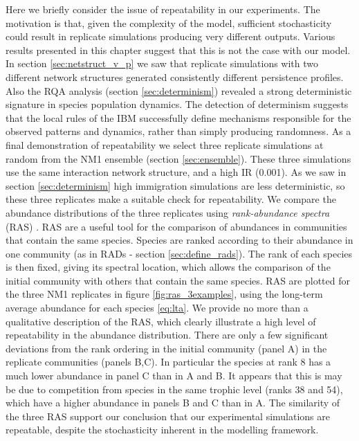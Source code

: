Here we briefly consider the issue of repeatability in our experiments. The motivation is that, given the complexity of the model, sufficient stochasticity could result in replicate simulations producing very different outputs. Various results presented in this chapter suggest that this is not the case with our model. In section \ref{sec:netstruct_v_p} we saw that replicate simulations with two different network structures generated consistently different persistence profiles. Also the RQA analysis (section \ref{sec:determinism}) revealed a strong deterministic signature in species population dynamics. The detection of determinism suggests that the local rules of the IBM successfully define mechanisms responsible for the observed patterns and dynamics, rather than simply producing randomness. As a final demonstration of repeatability we select three replicate simulations at random from the NM1 ensemble (section \ref{sec:ensemble}). These three simulations use the same interaction network structure, and a high IR (0.001). As we saw in section \ref{sec:determinism} high immigration simulations are less deterministic, so these three replicates make a suitable check for repeatability. We compare the abundance distributions of the three replicates using \emph{rank-abundance spectra} (RAS) \cite{mac2007use}. RAS are a useful tool for the comparison of abundances in communities that contain the same species. Species are ranked according to their abundance in one community (as in RADs - section \ref{sec:define_rads}). The rank of each species is then fixed, giving its spectral location, which allows the comparison of the initial community with others that contain the same species. RAS are plotted for the three NM1 replicates in figure \ref{fig:ras_3examples}, using the long-term average abundance for each species \eqref{eq:lta}. We provide no more than a qualitative description of the RAS, which clearly illustrate a high level of repeatability in the abundance distribution. There are only a few significant deviations from the rank ordering in the initial community (panel A) in the replicate communities (panels B,C). In particular the species at rank 8 has a much lower abundance in panel C than in A and B. It appears that this is may be due to competition from species in the same trophic level (ranks 38 and 54), which have a higher abundance in panels B and C than in A. The similarity of the three RAS support our conclusion that our experimental simulations are repeatable, despite the stochasticity inherent in the modelling framework.

